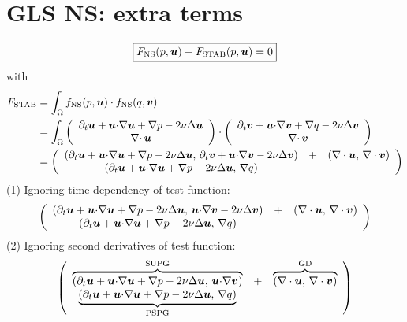 \documentclass[onefignum,onetabnum]{siamart190516}
\begin{document}

\section{GLS NS: extra terms}
\begin{align*}
\boxed{F_{\text{NS}}(p,{\boldsymbol u}) + F_{\text{STAB}}(p,{\boldsymbol u}) = 0}
\end{align*}
with
\begin{equation}
\begin{aligned}
F_{\text{STAB}} &= \int_\Omega f_{\text{NS}}(p,{\boldsymbol u}) \cdot f_{\text{NS}}(q,{\boldsymbol v})
\\&=\int_\Omega
\left(
\begin{array}{c}
    \partial_t {\boldsymbol u}  + {\boldsymbol u} {\cdot} \nabla {\boldsymbol u} 
    + \nabla p - 2 \nu \Delta \bm u \\
    \nabla{\cdot\,} {\boldsymbol u} 
\end{array}
\right)
\cdot
\left(
\begin{array}{c}
    \partial_t {\boldsymbol v}  + {\boldsymbol u} {\cdot} \nabla {\boldsymbol v} 
    + \nabla q - 2 \nu \Delta {\boldsymbol v} \\
    \nabla{\cdot\,} {\boldsymbol v}
\end{array}
\right)
\\&=
\left(
\begin{array}{ccc}
    (\partial_t {\boldsymbol u}  + {\boldsymbol u} {\cdot} \nabla {\boldsymbol u} 
    + \nabla p - 2 \nu \Delta \bm u ,\,\partial_t {\boldsymbol v}  + {\boldsymbol u} {\cdot} \nabla {\boldsymbol v} 
    - 2 \nu \Delta {\boldsymbol v}) &+& (\nabla \cdot {\boldsymbol u},\, \nabla \cdot {\boldsymbol v}) \\
    (\partial_t {\boldsymbol u}  + {\boldsymbol u} {\cdot} \nabla {\boldsymbol u} 
    + \nabla p - 2 \nu \Delta \bm u,\, \nabla q)
\end{array}
\right)
  \end{aligned}
\end{equation}
(1) Ignoring time dependency of test function:
\begin{equation}
  \begin{aligned}
\left(
\begin{array}{ccc}
    (\partial_t {\boldsymbol u}  + {\boldsymbol u} {\cdot} \nabla {\boldsymbol u} 
    + \nabla p - 2 \nu \Delta \bm u ,\,{\boldsymbol u} {\cdot} \nabla {\boldsymbol v} 
    - 2 \nu \Delta {\boldsymbol v}) &+ & (\nabla \cdot {\boldsymbol u},\, \nabla \cdot {\boldsymbol v}) \\
    (\partial_t {\boldsymbol u}  + {\boldsymbol u} {\cdot} \nabla {\boldsymbol u} 
    + \nabla p - 2 \nu \Delta \bm u,\, \nabla q)
\end{array}
\right)
  \end{aligned}
\end{equation}
(2) Ignoring second derivatives of test function:
\begin{equation}
  \begin{aligned}
\left(
\begin{array}{ccc}
    \overbrace{(\partial_t {\boldsymbol u}  + {\boldsymbol u} {\cdot} \nabla {\boldsymbol u} 
    + \nabla p  - 2 \nu \Delta \bm u ,\,{\boldsymbol u} {\cdot} \nabla {\boldsymbol v})}^{\text{SUPG}} &+ & 
    \overbrace{(\nabla \cdot {\boldsymbol u},\, \nabla \cdot {\boldsymbol v})}^{\text{GD}} \\
    \underbrace{(\partial_t {\boldsymbol u}  + {\boldsymbol u} {\cdot} \nabla {\boldsymbol u} 
    + \nabla p - 2 \nu \Delta \bm u,\, \nabla q)}_{\text{PSPG}} &&
\end{array}
\right)
  \end{aligned}
\end{equation}
\end{document}
